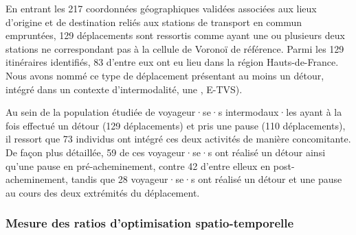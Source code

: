 \begin{refsegment}
En entrant les 217 coordonnées géographiques validées associées aux lieux d'origine et de destination reliés aux stations de transport en commun empruntées, 129 déplacements sont ressortis comme ayant une ou plusieurs deux stations ne correspondant pas à la cellule de Voronoï de référence. Parmi les 129 itinéraires identifiés, 83 d'entre eux ont eu lieu dans la région Hauts-de-France. Nous avons nommé ce type de déplacement présentant au moins un détour, intégré dans un contexte d'\gls{intermodalité}, une , \acrfull{E-TVS}).%

Au sein de la population étudiée de voyageur·se·s intermodaux·les ayant à la fois effectué un détour (129 déplacements) et pris une pause (110 déplacements), il ressort que 73 individus ont intégré ces deux activités de manière concomitante. De façon plus détaillée, 59 de ces voyageur·se·s ont réalisé un détour ainsi qu'une pause en pré-acheminement, contre 42 d'entre elleux en post-acheminement, tandis que 28 voyageur·se·s ont réalisé un détour et une pause au cours des deux extrémités du déplacement.%

\subsubsection*{Mesure des ratios d'optimisation spatio-temporelle
    \label{chap5:calcul-ratio-optimisation}
    }


\end{refsegment}
